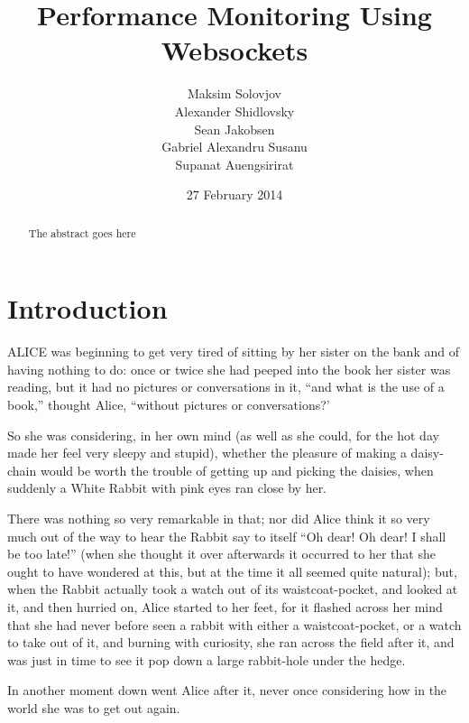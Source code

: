 \documentclass{l3proj}
\begin{document}
\title{Performance Monitoring Using Websockets}
\author{Maksim Solovjov \\
        Alexander Shidlovsky \\
        Sean Jakobsen \\
        Gabriel Alexandru Susanu \\
        Supanat Auengsirirat}
\date{27 February 2014}
\maketitle
\begin{abstract}

The abstract goes here

\end{abstract}
\educationalconsent
\tableofcontents
\chapter{Introduction}
\label{intro}

ALICE \cite{alice} was beginning to get very tired of sitting by her sister
on the bank and of having nothing to do: once or twice she had peeped into
the book her sister was reading, but it had no pictures or conversations in
it, ``and what is the use of a book,'' thought Alice, ``without pictures or
conversations?'

So she was considering, in her own mind (as well as she could, for the hot
day made her feel very sleepy and stupid), whether the pleasure of making a
daisy-chain would be worth the trouble of getting up and picking the
daisies, when suddenly a White Rabbit with pink eyes ran close by her.

There was nothing so very remarkable in that; nor did Alice think it so
very much out of the way to hear the Rabbit say to itself ``Oh dear! Oh
dear! I shall be too late!'' (when she thought it over afterwards it
occurred to her that she ought to have wondered at this, but at the time it
all seemed quite natural); but, when the Rabbit actually took a watch out
of its waistcoat-pocket, and looked at it, and then hurried on, Alice
started to her feet, for it flashed across her mind that she had never
before seen a rabbit with either a waistcoat-pocket, or a watch to take out
of it, and burning with curiosity, she ran across the field after it, and
was just in time to see it pop down a large rabbit-hole under the hedge.

In another moment down went Alice after it, never once considering how in
the world she was to get out again.
\end{document}

